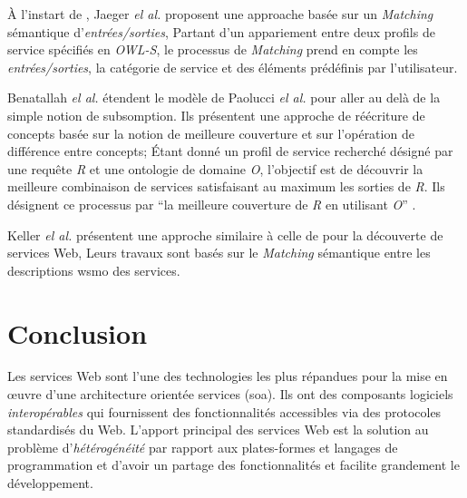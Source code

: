     À l'instart de \cite{paolucci2002semantic}, Jaeger \emph{el al.}
    \cite{jaeger2005ranked} proposent une approache basée sur un
    \textit{Matching} sémantique d'\textit{entrées/sorties}, Partant
    d'un appariement entre deux profils de service spécifiés en
    \textit{OWL-S}, le processus de \textit{Matching} prend en compte
    les \textit{entrées/sorties}, la catégorie de service et des
    éléments prédéfinis par l'utilisateur.\bigskip

    Benatallah \emph{el al.} \cite{benatallah2005automating,
      benatallah2003request} étendent le modèle de Paolucci \emph{el
      al.}  pour aller au delà de la simple notion de subsomption. Ils
    présentent une approche de réécriture de concepts basée sur la
    notion de meilleure couverture et sur l'opération de différence
    entre concepts; Étant donné un profil de service recherché désigné
    par une requête \textit{R} et une ontologie de domaine \textit{O},
    l'objectif est de découvrir la meilleure combinaison de services
    satisfaisant au maximum les sorties de \textit{R}. Ils désignent
    ce processus par ``la meilleure couverture de \textit{R} en
    utilisant \textit{O}'' \cite{elie2010}.\bigskip

    Keller \emph{el al.} \cite{keller2004wsmo, keller2005automatic}
    présentent une approche similaire à celle de
    \cite{paolucci2002semantic} pour la découverte de services Web,
    Leurs travaux sont basés sur le \textit{Matching} sémantique entre
    les descriptions \acrshort{wsmo} des services.


\section*{Conclusion}
\label{sec:conclusion}
 

Les services Web sont l'une des technologies les plus répandues pour
la mise en œuvre d'une architecture orientée services
(\acrshort{soa}). Ils ont des composants logiciels
\textit{interopérables} qui fournissent des fonctionnalités
accessibles via des protocoles standardisés du Web. L'apport principal
des services Web est la solution au problème d'\textit{hétérogénéité}
par rapport aux plates-formes et langages de programmation et d'avoir
un partage des fonctionnalités et facilite grandement le
développement.\medskip


